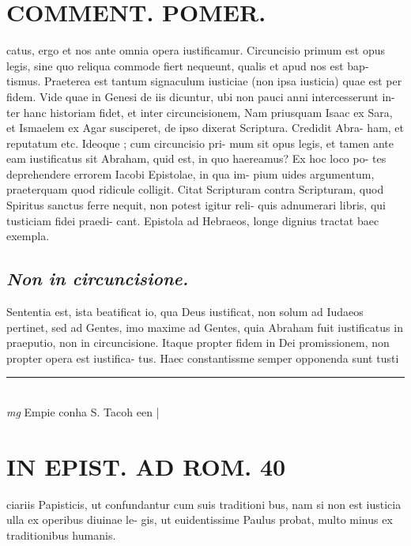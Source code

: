 \documentclass{article}
\begin{document}
\begin{pages}
\section*{COMMENT. POMER.  }\pstart catus, ergo et nos ante omnia opera iustificamur.  Circuncisio primum est opus legis, sine quo reliqua commode fiert nequeunt, qualis et apud nos est bap- tismus. Praeterea est tantum signaculum iusticiae (non ipsa iusticia) quae est per fidem. Vide quae in Genesi de iis dicuntur, ubi non pauci anni intercesserunt in- ter hanc historiam fidet, et inter circuncisionem, Nam priusquam Isaac ex Sara, et Ismaelem ex Agar susciperet, de ipso dixerat Scriptura. Credidit Abra- ham, et reputatum etc. Ideoque ; cum circuncisio pri- mum sit opus legis, et tamen ante eam iustificatus sit Abraham, quid est, in quo haereamus? Ex hoc loco po- tes deprehendere errorem Iacobi Epistolae, in qua im- pium uides argumentum, praeterquam quod ridicule colligit. Citat Scripturam contra Scripturam, quod Spiritus sanctus ferre nequit, non potest igitur reli- quis adnumerari libris, qui tusticiam fidei praedi- cant. Epistola ad Hebraeos, longe dignius tractat baec exempla.   \pend
{}
{}
\subsection*{\textit{Non in circuncisione. }}\pstart Sententia est, ista beatificat io, qua Deus iustificat, non solum ad Iudaeos pertinet, sed ad Gentes, imo maxime ad Gentes, quia Abraham fuit iustificatus in praeputio, non in circuncisione. Itaque propter fidem in Dei promissionem, non propter opera est iustifica- tus. Haec constantissme semper opponenda sunt tusti  \pend
\vspace{0.5cm}\noindent
\vspace{0.2cm}\rule{1cm}{0.2pt}\\ 
\hspace{0.2cm}\textit{mg}
\footnotesize Empie conha S. Tacoh een 
\normalsize| 
\section*{IN EPIST. AD ROM.  40 }
\marginpar{[ p.]}\pstart ciariis Papisticis, ut confundantur cum suis traditioni bus, nam si non est iusticia ulla ex operibus diuinae le- gis, ut euidentissime Paulus probat, multo minus ex traditionibus humanis.   \pend
{}
{}

\end{pages}
\end{document}
